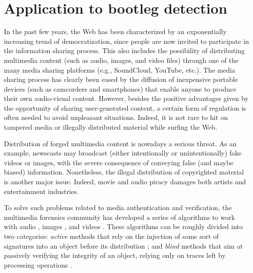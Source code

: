 \chapter{Application to bootleg detection}
\label{Chap:Bootleg}
In the past few years, the Web has been characterized by an exponentially increasing trend of democratization, since people are now invited to participate in the information sharing process. This also includes the possibility of distributing multimedia content (such as audio, images, and video files) through one of the many media sharing platforms (e.g., SoundCloud, YouTube, etc.). The media sharing process has clearly been eased by the diffusion of inexpensive portable devices (such as camcorders and smartphones) that enable anyone to produce their own audio-visual content. However, besides the positive advantages given by the opportunity of sharing user-generated content, a certain form of regulation is often needed to avoid unpleasant situations. Indeed, it is not rare to hit on tampered media or illegally distributed material while surfing the Web.

Distribution of forged multimedia content is nowadays a serious threat. As an example, newscasts may broadcast (either intentionally or unintentionally) fake videos or images, with the severe consequence of conveying false (and maybe biased) information. Nonetheless, the illegal distribution of copyrighted material is another major issue. Indeed, movie and audio piracy damages both artists and entertainment industries.

To solve such problems related to media authentication and verification, the multimedia forensics community has developed a series of algorithms to work with audio \cite{Gupta2012}, images \cite{Piva2013}, and videos \cite{Milani2012}. These algorithms can be roughly divided into two categories: \textit{active} methods that rely on the injection of some sort of signatures into an object before its distribution \cite{Cox2008,Chena2012,Wang2014}; and \textit{blind} methods that aim at passively verifying the integrity of an object, relying only on traces left by processing operations \cite{Mahdian2010,Dittmar2012}. 

